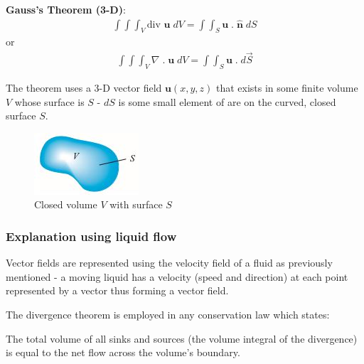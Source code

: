 \documentclass[10pt,a4paper]{article}
\begin{document}
\begin{tcolorbox}[breakable,colback=white]
\textbf{Gauss's Theorem (3-D)}: 
\begin{align*}
    \int \int \int_V \text{div }\textbf{u}\;dV = \int\int_S \textbf{u}\;.\;\hat{\textbf{n}}\; dS
\end{align*}
or
\begin{align*}
    \int \int \int_V \nabla \; .\;\textbf{u}\; dV = \int \int_S \textbf{u}\; .\; d\overrightarrow{S}
\end{align*}
\end{tcolorbox}

The theorem uses a 3-D vector field $\textbf{u}(x,y,z)$ that exists in some finite volume $V$ whose
surface is $S$ - $dS$ is some small element of are on the curved, closed surface $S$.
\begin{figure} [h!]
    \centering
    \includegraphics[]{Gauss.JPG}
    \caption{Closed volume $V$ with surface $S$}
\end{figure}

\subsubsection{Explanation using liquid flow}

Vector fields are represented using the velocity field of a fluid as previously mentioned - a moving
liquid has a velocity (speed and direction) at each point represented by a vector thus forming a
vector field.

The divergence theorem is employed in any conservation law which states:
\begin{center}
    The total volume of all sinks and sources (the volume integral of the divergence) is equal to the net flow across the volume's boundary.
\end{center}
\end{document}
